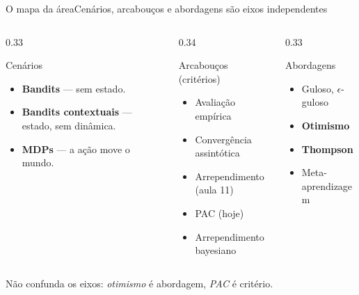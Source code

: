 \documentclass[aspectratio=169, 11pt]{beamer}
\begin{document}
\begin{frame}{O mapa da área}{Cenários, arcabouços e abordagens são eixos independentes}
  \begin{columns}[T]
    \begin{column}{0.33\textwidth}
      \begin{defbox}{Cenários}
        \begin{itemize}
          \item \textbf{Bandits} --- sem estado.
          \item \textbf{Bandits contextuais} --- estado, sem dinâmica.
          \item \textbf{MDPs} --- a ação move o mundo.
        \end{itemize}
      \end{defbox}
    \end{column}
    \begin{column}{0.34\textwidth}
      \begin{teobox}{Arcabouços (critérios)}
        \begin{itemize}
          \item Avaliação empírica
          \item Convergência assintótica
          \item Arrependimento (aula 11)
          \item \alert{PAC (hoje)}
          \item Arrependimento bayesiano
        \end{itemize}
      \end{teobox}
    \end{column}
    \begin{column}{0.33\textwidth}
      \begin{algbox}{Abordagens}
        \begin{itemize}
          \item Guloso, $\epsilon$-guloso
          \item \textbf{Otimismo}
          \item \textbf{Thompson}
          \item Meta-aprendizagem
        \end{itemize}
      \end{algbox}
    \end{column}
  \end{columns}
  \begin{ideiabox}
    Não confunda os eixos: \emph{otimismo} é abordagem, \emph{PAC} é critério.
  \end{ideiabox}
\end{frame}
\end{document}
